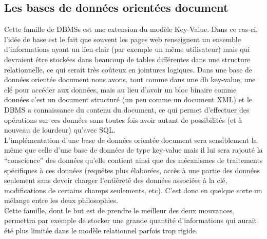 \documentclass[11pt]{article}
\begin{document}
\subsection{Les bases de données orientées document}
Cette famille de DBMSs est une extension du modèle Key-Value. Dans ce cas-ci, l'idée de base est le fait que souvent les pages web renseignent un ensemble d'informations ayant un lien clair (par exemple un même utilisateur) mais qui devraient être stockées dans beaucoup de tables différentes dans une structure relationnelle, ce qui serait très coûteux en jointures logiques. Dans une base de données orientée document nous avons, tout comme dans une db key-value, une clé pour accéder aux données, mais au lieu d'avoir un bloc binaire comme données c'est un document structuré (un peu comme un document XML) et le DBMS a connaissance du contenu du document, ce qui permet d'effectuer des opérations sur ces données sans toutes fois avoir autant de possibilités (et à nouveau de lourdeur) qu'avec SQL. \\
L'implémentation d'une base de données orientée document sera sensiblement la même que celle d'une base de données de type key-value mais il lui sera rajouté la ``conscience'' des données qu'elle contient ainsi que des mécanismes de traitements spécifiques à ces données (requêtes plus élaborées, accès à une partie des données seulement sans devoir charger l'entièreté des données associées à la clé, modifications de certains champs seulements, etc). C'est donc en quelque sorte un mélange entre les deux philosophies. \\
Cette famille, dont le but est de prendre le meilleur des deux mouvances, permettra par exemple de stocker une grande quantité d'informations qui aurait été plus limitée dans le modèle relationnel parfois trop rigide.
\end{document}
